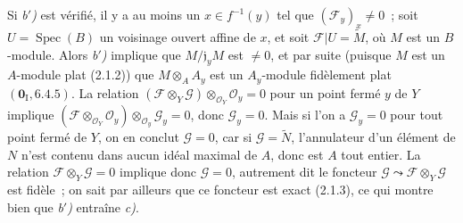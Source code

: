 Si \emph{b$'$)} est vérifié, il y a au moins un $x\in f^{-1}(y)$ tel que
$(\mathscr F_y)_x\neq0$~; soit $U=\operatorname{Spec}(B)$ un voisinage ouvert
affine de $x$, et soit $\mathscr F|U=\widetilde M$, où $M$ est un $B$-module.
Alors \emph{b$'$)} implique que $M/\mathfrak j_yM$ est $\neq0$, et par suite
(puisque $M$ est un $A$-module plat (2.1.2)) que
$M\otimes_A A_y$ est un $A_y$-module fidèlement plat
$(\mathbf{0}_{\mathrm I},6.4.5)$. La relation
$(\mathscr F\otimes_Y\mathscr G)\otimes_{\mathcal O_Y}\mathcal O_y=0$ pour un point fermé
$y$ de $Y$ implique
$(\mathscr F\otimes_{\mathcal O_Y}\mathcal O_y)\otimes_{\mathcal O_y}\mathscr G_y=0$,
donc $\mathscr G_y=0$. Mais si l'on a $\mathscr G_y=0$ pour tout point fermé
de $Y$, on en conclut $\mathscr G=0$, car si $\mathscr G=\widetilde N$,
l'annulateur d'un élément de $N$ n'est contenu dans aucun idéal maximal de
$A$, donc est $A$ tout entier. La relation
$\mathscr F\otimes_Y\mathscr G=0$ implique donc $\mathscr G=0$, autrement dit
le foncteur $\mathscr G\leadsto\mathscr F\otimes_Y\mathscr G$ est fidèle~; on
sait par ailleurs que ce foncteur est exact (2.1.3), ce qui montre bien que
\emph{b$'$)} entraîne \emph{c)}.

